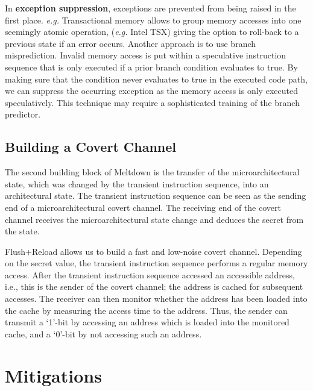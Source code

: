 \documentclass[runningheads]{llncs}
\begin{document}
In \textbf{exception suppression}, exceptions are prevented from being raised in the first place. \textit{e.g.} Transactional memory allows to group memory accesses into one seemingly atomic operation, (\textit{e.g.} Intel TSX) giving the option to roll-back to a previous state if an error occurs. Another approach is to use branch misprediction. Invalid memory access is put within a speculative instruction sequence that is only executed if a prior branch condition evaluates to true. By making sure that the condition never evaluates to true in the executed code path, we can suppress the occurring exception as the memory access is only executed speculatively. This technique may require a sophisticated training of the branch predictor.

\subsection{Building a Covert Channel}
The second building block of Meltdown is the transfer of the microarchitectural state, which was changed by the transient instruction sequence, into an architectural state. The transient instruction sequence can be seen as the sending end of a microarchitectural covert channel. The receiving end of the covert channel receives the microarchitectural state change and deduces the secret from the state.

Flush+Reload allows us to build a fast and low-noise covert channel. Depending on the secret value, the transient instruction sequence performs a regular memory access. After the transient instruction sequence accessed an accessible address, i.e., this is the sender of the covert channel; the address is cached for subsequent accesses. The receiver can then monitor whether the address has been loaded into the cache by measuring the access time to the address. Thus, the sender can transmit a ‘1’-bit by accessing an address which is loaded into the monitored cache, and a ‘0’-bit by not accessing such an address.

\section{Mitigations}
\end{document}
